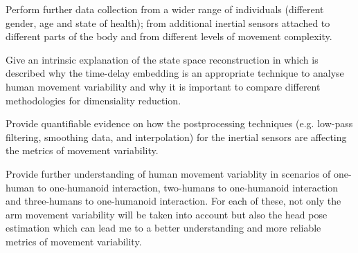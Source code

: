 \documentclass{sigchi}
\begin{document}
\begin{description}
  \setlength{\itemsep}{0pt}
  \setlength{\parskip}{0pt}
  \item [(i)]Perform further data collection from a wider range of individuals
  (different gender, age and state of health); from additional inertial sensors
  attached to different parts of the body and from different levels of movement
  complexity.

  \item [(ii)] Give an intrinsic explanation of the state space reconstruction
  in which is described why the time-delay embedding is an appropriate technique
  to analyse human movement variability and why it is important to compare
  different methodologies for dimensiality reduction.

  \item [(iii)] Provide quantifiable evidence on how the postprocessing techniques
  (e.g. low-pass filtering, smoothing data, and interpolation) for the inertial
  sensors are affecting the metrics of movement variability.

  \item [(iv)] Provide further understanding of human movement variablity in
  scenarios of one-human to one-humanoid interaction,
  two-humans to one-humanoid interaction and three-humans to one-humanoid interaction.
  For each of these, not only the arm movement variability will be taken into account
  but also the head pose estimation which can lead me
  to a better understanding and more reliable metrics of movement variability.

\end{description}
\end{document}
